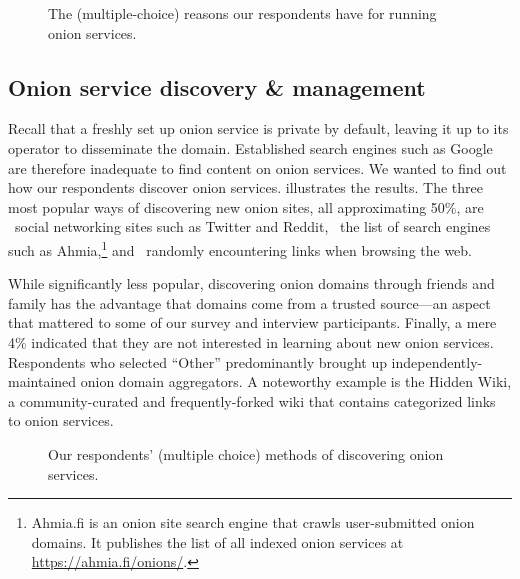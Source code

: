\begin{figure}[t]
    \centering
    
    \caption{The (multiple-choice) reasons our respondents have for running
    onion services.}
    \label{fig:onion-operation-reasons}
\end{figure}

\subsection{Onion service discovery \& management}
\label{sec:manage}

Recall that a freshly set up onion service is private by default, leaving it up
to its operator to disseminate the domain.  Established search engines such as
Google are therefore inadequate to find content on onion services.  We wanted to
find out how our respondents discover onion services.
 illustrates the results.  The three most popular ways
of discovering new onion sites, all approximating 50\%, are \first~social
networking sites such as Twitter and Reddit, \second~the list of search engines
such as Ahmia,\footnote{Ahmia.fi is an onion site search engine that crawls
user-submitted onion domains.  It publishes the list of all indexed onion
services at \url{https://ahmia.fi/onions/}.} and \third~randomly encountering
links when browsing the web.

While significantly less popular, discovering onion domains through friends and
family has the advantage that domains come from a trusted source---an aspect
that mattered to some of our survey and interview participants.  Finally, a mere
4\% indicated that they are not interested in learning about new onion services.
Respondents who selected ``Other'' predominantly brought up
independently-maintained onion domain aggregators.  A noteworthy example is the
Hidden Wiki, a community-curated and frequently-forked wiki that contains
categorized links to onion services.

\begin{figure}[t]
    \centering
    
    \caption{Our respondents' (multiple choice) methods of discovering onion
    services.}
    \label{fig:onion-discovery}
\end{figure}


